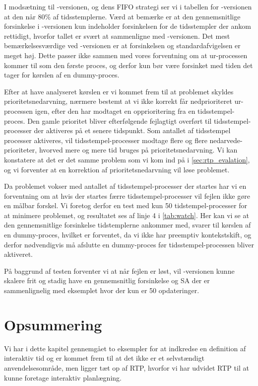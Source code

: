 I modsætning til -versionen, og dens FIFO strategi ser vi i tabellen for -versionen at den  når 80\% af tidsstemplerne. Værd at bemærke er at den gennemsnitlige forsinkelse i -versionen kun indeholder forsinkelsen for de tidsstempler der ankom rettidigt, hvorfor tallet er svært at sammenligne med -versionen. Det mest bemærkelsesværdige ved -versionen er at forsinkelsen og standardafvigelsen er meget høj. Dette passer ikke sammen med vores forventning om at ur-processen kommer til som den første proces, og derfor kun bør være forsinket med tiden det tager for kørslen af en  dummy-proces.

Efter at have analyseret kørslen er vi kommet frem til at problemet skyldes prioritetsnedarvning, nærmere bestemt at vi ikke korrekt får nedprioriteret ur-processen igen, efter den har modtaget en opprioritering fra en tidsstempel-proces. Den gamle prioritet bliver efterfølgende fejlagtigt overført til tidsstempel-processer der aktiveres på et senere tidspunkt. Som antallet af tidsstempel processer aktiveres, vil tidsstempel-processer modtage flere og flere nedarvede-prioriteter, hvorved mere og mere tid bruges på prioritetsnedarvning. Vi kan konstatere at det er det samme problem som vi kom ind på i \cref{sec:rtp_evalation}, og vi forventer at en korrektion af prioritetsnedarvning vil løse problemet. 

Da problemet vokser med antallet af tidsstempel-processer der startes har vi en forventning om at hvis der startes færre tidsstempel-processer vil fejlen ikke gøre en målbar forskel. Vi foretog derfor en test med kun 50 tidstempel-processer for at minimere problemet, og resultatet ses af linje 4 i \cref{tab:watch}. Her kan vi se at  den gennemsnitlige forsinkelse tidstemplerne ankommer med, svarer til kørslen af en dummy-proces, hvilket er forventet, da vi ikke har preemptiv kontekstskift, og derfor nødvendigvis må afslutte en dummy-proces før tidsstempel-processen bliver aktiveret. 

På baggrund af testen forventer vi at når fejlen er løst, vil -versionen kunne skalere frit og stadig have en gennemsnitlig forsinkelse og SA der er sammenlignelig med eksemplet hvor der kun er 50 opdateringer.
\section{Opsummering}

Vi har i dette kapitel gennemgået to eksempler for at indkredse en definition af interaktiv tid og er kommet frem til at det ikke er et selvstændigt anvendelsesområde, men ligger tæt op af RTP, hvorfor vi har udvidet RTP til at kunne foretage interaktiv planlægning.

